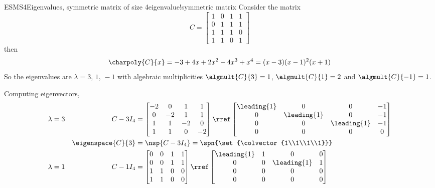 \begin{example}{ESMS4}{Eigenvalues, symmetric matrix of size 4}{eigenvalue!symmetric matrix}
Consider the matrix
%
\begin{equation*}
C=
\begin{bmatrix}
1 &  0 &  1 &  1\\
0 &  1 &  1 &  1\\
1 &  1 &  1 &  0\\
1 &  1 &  0 &  1
\end{bmatrix}
\end{equation*}
%
then
%
\begin{equation*}
\charpoly{C}{x}=-3+4x+2x^2-4x^3+x^4=(x-3)(x-1)^2(x+1)
\end{equation*}
%
So the eigenvalues are $\lambda=3,\,1,\,-1$ with algebraic multiplicities $\algmult{C}{3}=1$, $\algmult{C}{1}=2$ and $\algmult{C}{-1}=1$.\par
%
Computing eigenvectors,
%
\begin{align*}
\lambda&=3&C- 3I_4&=
\begin{bmatrix}
-2 & 0 & 1 & 1\\
0 & -2 & 1 & 1\\
1 & 1 & -2 & 0\\
1 & 1 & 0 & -2
\end{bmatrix}
\rref
\begin{bmatrix}
\leading{1} & 0 & 0 & -1\\
0 & \leading{1} & 0 & -1\\
0 & 0 & \leading{1} & -1\\
0 & 0 & 0 & 0
\end{bmatrix}\\
&&\eigenspace{C}{3}&=\nsp{C-3I_4}
=\spn{\set{\colvector{1\\1\\1\\1}}}\\
%
\lambda&=1&C-1I_4&=
\begin{bmatrix}
0 & 0 & 1 & 1\\
0 & 0 & 1 & 1\\
1 & 1 & 0 & 0\\
1 & 1 & 0 & 0
\end{bmatrix}
\rref
\begin{bmatrix}
\leading{1} & 1 & 0 & 0\\
0 & 0 & \leading{1} & 1\\
0 & 0 & 0 & 0\\
0 & 0 & 0 & 0
\end{bmatrix}\\

\end{align*}
\end{example}
